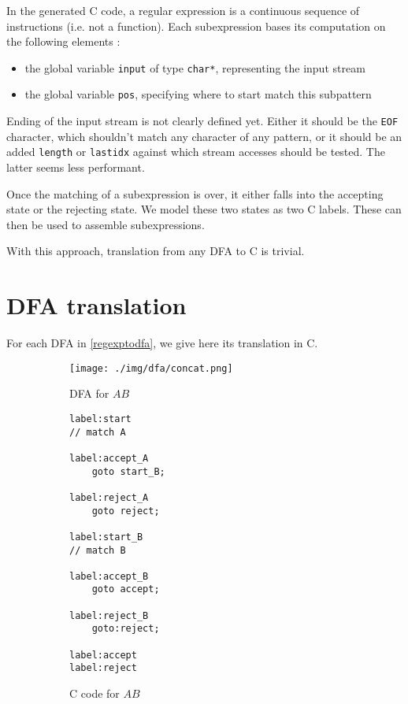 \documentclass[11pt,a4paper]{report}
\newcommand{\regexp}[1]{$#1$}
\newcommand{\ccode}[1]{\texttt{#1}}
\begin{document}
In the generated C code, a regular expression is a continuous sequence of instructions (i.e. not a function). Each subexpression bases its computation on the following elements :
\begin{itemize}
\item the global variable \ccode{input} of type \ccode{char*}, representing the input stream
\item the global variable \ccode{pos}, specifying where to start match this subpattern
\end{itemize}

Ending of the input stream is not clearly defined yet. Either it should be the \texttt{EOF} character, which shouldn't match any character of any pattern, or it should be an added \ccode{length} or \ccode{lastidx} against which stream accesses should be tested. The latter seems less performant.

Once the matching of a subexpression is over, it either falls into the accepting state or the rejecting state. We model these two states as two C labels. These can then be used to assemble subexpressions.

With this approach, translation from any DFA to C is trivial.

\section{DFA translation}

For each DFA in \ref{regexptodfa}, we give here its translation in C.

\begin{figure}[h!]
	\begin{subfigure}[h]{0.45\textwidth}
		\centering
		\texttt{[image: ./img/dfa/concat.png]}
		\caption{DFA for \regexp{AB}}
	\end{subfigure}
	\hspace{0.05\textwidth}
	\begin{subfigure}[h]{0.45\textwidth}
		\centering
		\begin{lstlisting}[style=C]
label:start
// match A

label:accept_A
	goto start_B;

label:reject_A
	goto reject;

label:start_B
// match B

label:accept_B
	goto accept;

label:reject_B
	goto:reject;

label:accept
label:reject
		\end{lstlisting}
		\caption{C code for \regexp{AB}}
	\end{subfigure}
	\caption{}
\end{figure}
\end{document}
